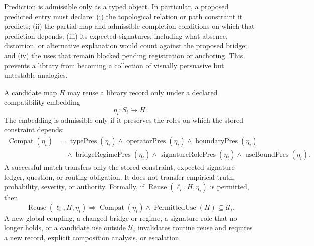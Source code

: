 \documentclass[10pt]{article}
\begin{document}
Prediction is admissible only as a typed object. In particular, a proposed predicted entry must declare: (i) the topological relation or path constraint it predicts; (ii) the partial-map and admissible-completion conditions on which that prediction depends; (iii) its expected signatures, including what absence, distortion, or alternative explanation would count against the proposed bridge; and (iv) the uses that remain blocked pending registration or anchoring. This prevents a library from becoming a collection of visually persuasive but untestable analogies.

A candidate map $H$ may reuse a library record only under a declared compatibility embedding
\begin{equation}
\eta_i:S_i\hookrightarrow H.
\label{eq:compatibility-embedding-supp}
\end{equation}
The embedding is admissible only if it preserves the roles on which the stored constraint depends:
\begin{equation}
\begin{aligned}
\operatorname{Compat}(\eta_i)
&=\operatorname{typePres}(\eta_i)\wedge
\operatorname{operatorPres}(\eta_i)\wedge
\operatorname{boundaryPres}(\eta_i)\\
&\quad\wedge\operatorname{bridgeRegimePres}(\eta_i)\wedge
\operatorname{signatureRolePres}(\eta_i)\wedge
\operatorname{useBoundPres}(\eta_i).
\end{aligned}
\label{eq:compatibility-supp}
\end{equation}
A successful match transfers only the stored constraint, expected-signature ledger, question, or routing obligation. It does not transfer empirical truth, probability, severity, or authority. Formally, if $\operatorname{Reuse}(\ell_i,H,\eta_i)$ is permitted, then
\begin{equation}
\operatorname{Reuse}(\ell_i,H,\eta_i)
\Longrightarrow
\operatorname{Compat}(\eta_i)\wedge
\operatorname{PermittedUse}(H)\subseteq\mathcal{U}_i.
\label{eq:reuse-bound-supp}
\end{equation}
A new global coupling, a changed bridge or regime, a signature role that no longer holds, or a candidate use outside $\mathcal{U}_i$ invalidates routine reuse and requires a new record, explicit composition analysis, or escalation.
\end{document}
